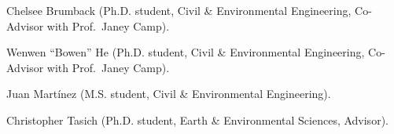 \item Chelsee Brumback (Ph.D. student, Civil \& Environmental Engineering,
Co-Advisor with Prof.\ Janey Camp).
\item Wenwen ``Bowen'' He (Ph.D. student, Civil \& Environmental Engineering, Co-Advisor with Prof.\ Janey Camp).
\item Juan Mart\'inez (M.S. student, Civil \& Environmental Engineering).
\item Christopher Tasich (Ph.D. student, Earth \& Environmental Sciences, Advisor).
